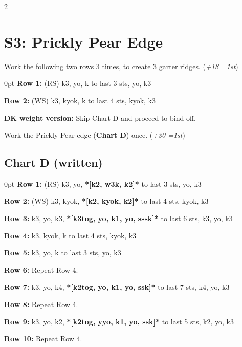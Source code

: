 \documentclass[12pt]{article}
\newcommand{\rowDir}[1]{\textbf{#1:}} %
\renewcommand{\repeat}[1]{\textbf{*[#1]*}} %
\newcommand{\increase}[1]{(\emph{+#1 
	\ifnum#1=1{st}\else{sts}\fi})}
\newenvironment{frnote}
    {%
    	\setlength{\FrameRule}{1.5pt}
    	\def\FrameCommand{\fboxrule=\FrameRule\fboxsep=\FrameSep \fcolorbox{framecolor}{shadecolor}}
    	\MakeFramed {\FrameRestore}}
    {\setlength{\FrameRule}{1pt}
	\endMakeFramed}
\newenvironment{unframed}
    {%
	\setlength{\parindent}{-2em}
	\begin{addmargin}[2em]{0pt}}
    {\end{addmargin}
	\setlength{\parindent}{0em}}
\begin{document}
\vfill

\begin{multicols}{2}

\section*{S3: Prickly Pear Edge}

Work the following two rows 3 times, to create 3 garter ridges. \increase{18}
\begin{unframed}
\hspace{-2em}\rowDir{Row 1} (RS) k3, yo, k to last 3 sts, yo, k3

\rowDir{Row 2} (WS) k3, kyok, k to last 4 sts, kyok, k3
\end{unframed}

\begin{frnote}
\textbf{DK weight version:} Skip Chart D and proceed to bind off.
\end{frnote}

Work the Prickly Pear edge (\textbf{Chart D}) once. \increase{30}

\vfill

\subsection*{Chart D (written)}
\begin{unframed}
\hspace{-2em}\rowDir{Row 1} (RS) k3, yo, \repeat{k2, w3k, k2} to last 3 sts, yo, k3

\rowDir{Row 2} (WS) k3, kyok, \repeat{k2, kyok, k2} to last 4 sts, kyok, k3

\rowDir{Row 3} k3, yo, k3, \repeat{k3tog, yo, k1, yo, sssk} to last 6 sts, k3, yo, k3

\rowDir{Row 4} k3, kyok, k to last 4 sts, kyok, k3

\rowDir{Row 5} k3, yo, k to last 3 sts, yo, k3

\rowDir{Row 6} Repeat Row 4.

\rowDir{Row 7} k3, yo, k4, \repeat{k2tog, yo, k1, yo, ssk} to last 7 sts, k4, yo, k3

\rowDir{Row 8} Repeat Row 4.

\rowDir{Row 9} k3, yo, k2, \repeat{k2tog, yyo, k1, yo, ssk} to last 5 sts, k2, yo, k3

\rowDir{Row 10} Repeat Row 4.
\end{unframed}

\end{multicols}
\end{document}
